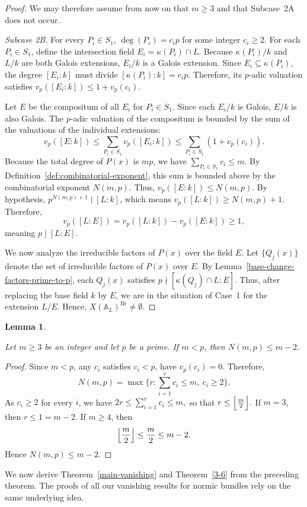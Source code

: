 \documentclass[10pt]{amsart}
\theoremstyle{plain}
\newtheorem{lemma}[thm]{Lemma}
\theoremstyle{definition}
\newcommand{\Br}{\operatorname{Br}}
\begin{document}
\begin{proof}
We may therefore assume from now on that \(m\ge 3\) and that Subcase~2A does
not occur.

\smallskip

\noindent\textit{Subcase 2B.} For every \(P_i\in S_1\), \(\deg(P_i)=c_i p\) for some integer \(c_i\ge 2\).
For each $P_i \in S_1$, define the intersection field $E_i = \kappa(P_i) \cap L$. Because $\kappa(P_i)/k$ and $L/k$ are both Galois extensions, $E_i/k$ is a Galois extension. Since $E_i \subseteq \kappa(P_i)$, the degree $[E_i:k]$ must divide $[\kappa(P_i):k] = c_i p$. Therefore, its $p$-adic valuation satisfies $v_p([E_i:k]) \le 1 + v_p(c_i)$.

Let $E$ be the compositum of all $E_i$ for $P_i \in S_1$. Since each $E_i/k$ is Galois, $E/k$ is also Galois. The $p$-adic valuation of the compositum is bounded by the sum of the valuations of the individual extensions:
$$
v_p([E:k]) \le \sum_{P_i \in S_1} v_p([E_i:k]) \le \sum_{P_i \in S_1} (1 + v_p(c_i)).
$$
Because the total degree of $P(x)$ is $mp$, we have $\sum_{P_i \in S_1} c_i \le m$. By Definition~\ref{def:combinatorial-exponent}, this sum is bounded above by the combinatorial exponent $N(m, p)$. Thus, $v_p([E:k]) \le N(m, p)$. 
By hypothesis, $p^{N(m,p)+1} \mid [L:k]$, which means $v_p([L:k]) \ge N(m, p) + 1$. Therefore,
$$
v_p([L:E]) = v_p([L:k]) - v_p([E:k]) \ge 1,
$$
meaning $p \mid [L:E]$.

We now analyze the irreducible factors of \(P(x)\) over the field \(E\). Let
\(\{Q_j(x)\}\) denote the set of irreducible factors of \(P(x)\) over \(E\).
By Lemma~\ref{base-change-factors-prime-to-p}, each \(Q_j(x)\) satisfies
\(p\nmid [\kappa(Q_j)\cap L:E]\). Thus, after replacing the base field \(k\) by
\(E\), we are in the situation of Case~1 for the extension \(L/E\). Hence, $X(\mathbb{A}_L)^{\Br}\neq\emptyset$.
\end{proof}\begin{lemma}\label{Nmp-bound}

Let $m\ge3$ be an integer and let $p$ be a prime. If $m<p$, then
\(N(m,p)\le m-2.\)
\end{lemma}

\begin{proof}
Since $m<p$, any $c_i$ satisfies $c_i<p$, have $v_p(c_i)=0$. Therefore,
$$
N(m,p)=\max\{r:\sum_{i=1}^r c_i\le m,\ c_i\ge2\}.
$$
As $c_i\ge2$ for every $i$, we have
\(2r\le\sum_{i=1}^r c_i\le m,\) so that
\(r\le\Bigl\lfloor\frac m2\Bigr\rfloor.\) If $m=3$, then $r\le1=m-2$. If $m\ge4$, then
$$
\Bigl\lfloor\frac m2\Bigr\rfloor\le\frac m2\le m-2.
$$ Hence $N(m,p)\le m-2$.
\end{proof}
We now derive Theorem~\ref{main-vanishing} and Theorem~\ref{3-6} from the preceding theorem. The proofs of all our vanishing results for normic bundles rely on the same underlying idea.
\end{document}
